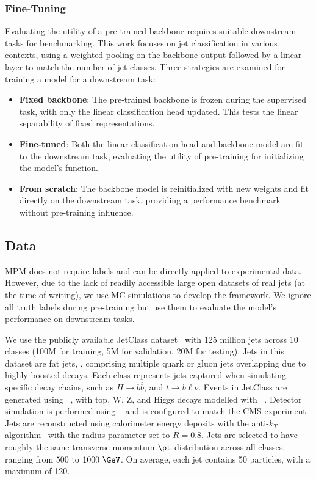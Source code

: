 \subsubsection{Fine-Tuning}
\label{subsec:fine-tune}

Evaluating the utility of a pre-trained backbone requires suitable downstream tasks for benchmarking.
This work focuses on jet classification in various contexts, using a weighted pooling on the backbone output followed by a linear layer to match the number of jet classes.
Three strategies are examined for training a model for a downstream task:

\begin{itemize}
    \item \textbf{Fixed backbone}: The pre-trained backbone is frozen during the supervised task, with only the linear classification head updated. This tests the linear separability of fixed representations.
    \item \textbf{Fine-tuned}: Both the linear classification head and backbone model are fit to the downstream task, evaluating the utility of pre-training for initializing the model's function.
    \item \textbf{From scratch}: The backbone model is reinitialized with new weights and fit directly on the downstream task, providing a performance benchmark without pre-training influence.
\end{itemize}

\subsection{Data}
\label{sec:mpm_data}

MPM does not require labels and can be directly applied to experimental data.
However, due to the lack of readily accessible large open datasets of real jets (at the time of writing), we use MC simulations to develop the framework.
We ignore all truth labels during pre-training but use them to evaluate the model's performance on downstream tasks.

We use the publicly available JetClass dataset~\cite{JetClass} with 125 million jets across 10 classes (100M for training, 5M for validation, 20M for testing).
Jets in this dataset are fat jets, , comprising multiple quark or gluon jets overlapping due to highly boosted decays.
Each class represents jets captured when simulating specific decay chains, such as $H \rightarrow b\overline{b}$, and $t \rightarrow b \ell \nu$.
Events in JetClass are generated using \pythia~\cite{Pythia8}, with top, W, Z, and Higgs decays modelled with \madgraph~\cite{MadGraph}.
Detector simulation is performed using \delphes~\cite{Delphes} and is configured to match the CMS experiment.
Jets are reconstructed using calorimeter energy deposits with the anti-$k_T$ algorithm~\cite{AntiKt} with the radius parameter set to $R=0.8$.
Jets are selected to have roughly the same transverse momentum $\pt$ distribution across all classes, ranging from $500$ to $1000~\GeV$.
On average, each jet contains 50 particles, with a maximum of 120.

